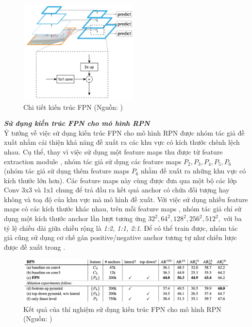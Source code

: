 {    \begin{figure}[H]
        \centering
        \includegraphics[width=6cm] {images/fpn_detail}
        \caption{Chi tiết kiến trúc FPN (Nguồn: \cite{lin2017feature})}
        \label{fig:fpn_detail}
    \end{figure}

    \noindent
    \textbf{\textit{Sử dụng kiến trúc FPN cho mô hình RPN}} \\
    Ý tưởng về việc sử dụng kiến trúc FPN  cho mô hình RPN  \cite{ren2015faster} được nhóm tác giả đề xuất nhằm cải thiện khả năng đề xuất ra các khu vực có kích thước chênh lệch nhau.
    Cụ thể, thay vì việc sử dụng một feature maps  thu được từ feature extraction module , nhóm tác giả sử dụng các feature maps  \textit{{${P}_{2}, {P}_{3}, {P}_{4}, {P}_{5}, {P}_{6}$}} (nhóm tác giả sử dụng thêm feature maps  ${P}_{6}$ nhằm đề xuất ra những khu vực có kích thước lớn hơn).
    Các feature maps  này cùng được đưa qua một bộ các lớp Conv  3x3 và 1x1 chung để trả đầu ra kết quả anchor  có chứa đối tượng hay không và toạ độ của khu vực mà mô hình đề xuất.
    Với việc sử dụng nhiều feature maps  có các kích thước khác nhau, trên mỗi feature maps , nhóm tác giả chỉ sử dụng một kích thước anchor  lần lượt tương ứng \textit{{${32}^{2}, {64}^{2}, {128}^{2}, {256}^{2}, {512}^{2},$}} với ba tỷ lệ chiều dài giữa chiều rộng là \textit{1:2, 1:1, 2:1}.
    Để có thể train được, nhóm tác giả cũng sử dụng cơ chế gán positive/negative anchor  tương tự như chiến lược được đề xuất trong \cite{ren2015faster}.

    \begin{figure}[H]
        \centering
        \includegraphics[width=12cm] {images/fpn_results_1}
        \caption{Kết quả của thí nghiệm sử dụng kiến trúc FPN cho mô hình RPN  \cite{ren2015faster} (Nguồn: \cite{lin2017feature})}
        \label{fig:fpn_results}
    \end{figure}

}
